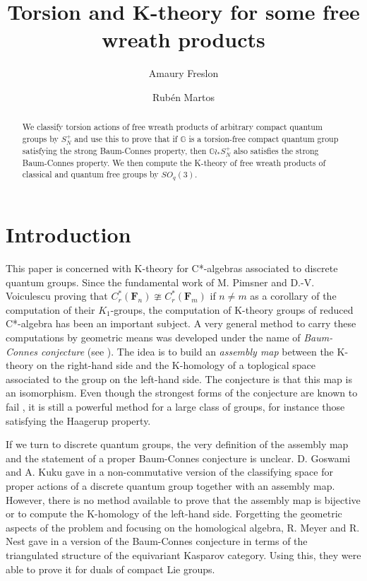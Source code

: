 \documentclass[a4paper, 11pt]{amsart}
\title{Torsion and K-theory for some free wreath products}
\author{Amaury Freslon}
\author{Rub\'{e}n Martos}
\date{}
\theoremstyle{plain}
\theoremstyle{definition}
\theoremstyle{remark}
\newcommand{\F}{\mathbf{F}}
\newcommand{\G}{\mathbb{G}}
\begin{document}
\begin{abstract}
We classify torsion actions of free wreath products of arbitrary compact quantum groups by $S_{N}^{+}$ and use this to prove that if $\G$ is a torsion-free compact quantum group satisfying the strong Baum-Connes property, then $\G\wr_{\ast}S_{N}^{+}$ also satisfies the strong Baum-Connes property. We then compute the K-theory of free wreath products of classical and quantum free groups by $SO_{q}(3)$.
\end{abstract}

\maketitle

\section{Introduction}

This paper is concerned with K-theory for C*-algebras associated to discrete quantum groups. Since the fundamental work of M. Pimsner and D.-V. Voiculescu \cite{pimsner1982k} proving that $C^{*}_{r}(\F_{n})\ncong C^{*}_{r}(\F_{m})$ if $n\neq m$ as a corollary of the computation of their $K_{1}$-groups, the computation of K-theory groups of reduced C*-algebra has been an important subject. A very general method to carry these computations by geometric means was developed under the name of \emph{Baum-Connes conjecture} (see \cite{baum1994classifying}). The idea is to build an \emph{assembly map} between the K-theory on the right-hand side and the K-homology of a toplogical space associated to the group on the left-hand side. The conjecture is that this map is an isomorphism. Even though the strongest forms of the conjecture are known to fail \cite{higson2002counterexamples}, it is still a powerful method for a large class of groups, for instance those satisfying the Haagerup property.

If we turn to discrete quantum groups, the very definition of the assembly map and the statement of a proper Baum-Connes conjecture is unclear. D. Goswami and A. Kuku gave in \cite{goswami2003complete} a non-commutative version of the classifying space for proper actions of a discrete quantum group together with an assembly map. However, there is no method available to prove that the assembly map is bijective or to compute the K-homology of the left-hand side. Forgetting the geometric aspects of the problem and focusing on the homological algebra, R. Meyer and R. Nest gave in \cite{meyer2006baum} a version of the Baum-Connes conjecture in terms of the triangulated structure of the equivariant Kasparov category. Using this, they were able to prove it for duals of compact Lie groups.
\end{document}
